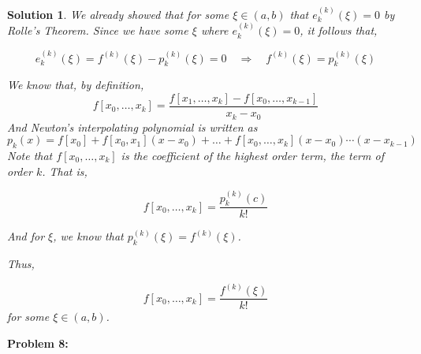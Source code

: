 \documentclass[12pt, letterpaper]{article}
\theoremstyle{nonumberplain}
\newtheorem{sol}{Solution}
\begin{document}
\begin{sol}
	We already showed that for some $\xi\in (a, b)$ that $e_k^{(k)}(\xi) = 0$ by Rolle's Theorem. Since we have some $\xi$ where $e_k^{(k)}(\xi) = 0$, it follows that,

	$$e_k^{(k)}(\xi) = f^{(k)}(\xi) - p_k^{(k)}(\xi) = 0 \quad \Rightarrow \quad f^{(k)}(\xi) = p_k^{(k)}(\xi)$$

	We know that, by definition, $$f[x_0, \ldots, x_k] = \frac{f[x_1, \ldots, x_k] - f[x_0, \ldots, x_{k-1}]}{x_k - x_0}$$
	And Newton's interpolating polynomial is written as $$p_k(x) = f[x_0] + f[x_0, x_1](x - x_0) + \ldots + f[x_0, \ldots, x_k](x - x_0)\cdots(x - x_{k-1}) $$
	Note that $f[x_0, \ldots, x_k]$ is the coefficient of the highest order term, the term of order $k$. That is,

	$$f[x_0, \ldots, x_k] = \frac{p_k^{(k)}(c)}{k!}$$

	And for $\xi$, we know that $p_k^{(k)}(\xi) = f^{(k)}(\xi)$.

	Thus,

	$$f[x_0, \dots, x_k] = \frac{f^{(k)}(\xi)}{k!}$$
	for some $\xi\in (a, b)$.
\end{sol}

\newpage

\hspace{18pt}\textbf{Problem 8:} \medskip

\end{document}
